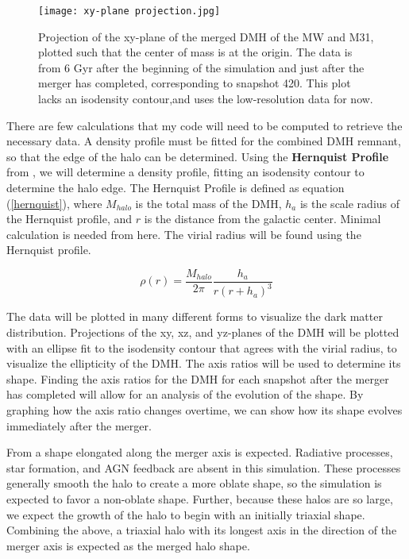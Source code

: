 \documentclass[fleqn,usenatbib]{mnras}
\begin{document}
\begin{figure}
	\texttt{[image: xy-plane projection.jpg]}
    \caption{Projection of the xy-plane of the merged DMH of the MW and M31, plotted such that the center of mass is at the origin. The data is from 6 Gyr after the beginning of the simulation and just after the merger has completed, corresponding to snapshot 420. This plot lacks an isodensity contour,and uses the low-resolution data for now.}                     
    \label{fig:xy-plane projection}
\end{figure}

There are few calculations that my code will need to be computed to retrieve the necessary data. A density profile must be fitted for the combined DMH remnant, so that the edge of the halo can be determined. Using the \textbf{Hernquist Profile} from \citet{Hernquist_1990}, we will determine a density profile, fitting an isodensity contour to determine the halo edge. The Hernquist Profile is defined as equation (\ref{hernquist}), where \begin{math}M_{halo}\end{math} is the total mass of the DMH, \begin{math}h_a\end{math} is the scale radius of the Hernquist profile, and \begin{math}r\end{math} is the distance from the galactic center. Minimal calculation is needed from here. The virial radius will be found using the Hernquist profile.

\begin{equation} \label{hernquist}
    \rho(r)=\frac{M_{halo}}{2\pi} \frac{h_a}{r(r+h_a)^3}
\end{equation}


The data will be plotted in many different forms to visualize the dark matter distribution. Projections of the xy, xz, and yz-planes of the DMH will be plotted with an ellipse fit to the isodensity contour that agrees with the virial radius, to visualize the ellipticity of the DMH. The axis ratios will be used to determine its shape. Finding the axis ratios for the DMH for each snapshot after the merger has completed will allow for an analysis of the evolution of the shape. By graphing how the axis ratio changes overtime, we can show how its shape evolves immediately after the merger.

From \citet{Despali_2016} a shape elongated along the merger axis is expected. Radiative processes, star formation, and AGN feedback are absent in this simulation. These processes generally smooth the halo to create a more oblate shape, so the simulation is expected to favor a non-oblate shape. Further, because these halos are so large, we expect the growth of the halo to begin with an initially triaxial shape. Combining the above, a triaxial halo with its longest axis in the direction of the merger axis is expected as the merged halo shape.
\end{document}
